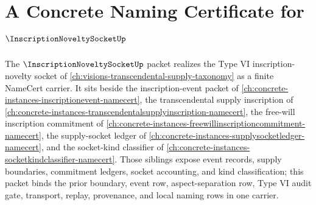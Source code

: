 \chapter{A Concrete Naming Certificate for $\InscriptionNoveltySocketUp$}
\label{ch:concrete-instances-inscriptionnoveltysocket-namecert}

The $\InscriptionNoveltySocketUp$ packet realizes the Type VI inscription-novelty socket of \autoref{ch:visions-transcendental-supply-taxonomy} as a finite NameCert carrier. It sits beside the inscription-event packet of \autoref{ch:concrete-instances-inscriptionevent-namecert}, the transcendental supply inscription of \autoref{ch:concrete-instances-transcendentalsupplyinscription-namecert}, the free-will inscription commitment of \autoref{ch:concrete-instances-freewillinscriptioncommitment-namecert}, the supply-socket ledger of \autoref{ch:concrete-instances-supplysocketledger-namecert}, and the socket-kind classifier of \autoref{ch:concrete-instances-socketkindclassifier-namecert}. Those siblings expose event records, supply boundaries, commitment ledgers, socket accounting, and kind classification; this packet binds the prior boundary, event row, aspect-separation row, Type VI audit gate, transport, replay, provenance, and local naming rows in one carrier.

